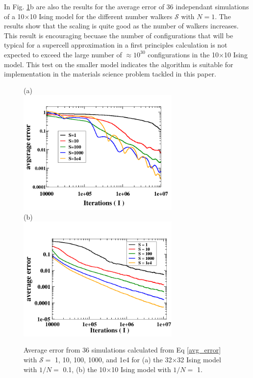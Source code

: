 \documentclass[aps,pre,reprint,superscriptaddress,showkeys]{revtex4-1}
\begin{document}
In Fig. \ref{thirtytwo_Stest}b are also the results for the average error of 36 independant simulations of a 10$\times$10 Ising model for the different number walkers $\mathcal{S}$ with $N=1$. The results show that the scaling is quite good as the number of walkers increases. This result is encouraging becuase the number of configurations that will be typical for a supercell approximation in a first principles calculation is not expected to exceed the large number of $\approx 10^{30}$ configurations in the 10$\times$10 Ising model.  This test on the smaller model indicates the algorithm  is suitable for implementation in the materials science problem tackled in this paper. 
\begin{figure}[h!]
(a)\\
\includegraphics[width=8cm]{./figures/thirtytwo_root0_1_varyS.png}\\
(b)\\
\includegraphics[width=8cm]{./figures/10X10_root1_varyS.png}
\caption{ Average error from 36 simulations calculated from Eq \ref{avg_error} with $\mathcal{S}=$ 1, 10, 100, 1000, and 1e4 for  (a) the 32$\times$32 Ising model with $1/N=$ 0.1, (b) the 10$\times$10 Ising model with $1/N =$ 1. \label{thirtytwo_Stest} }
\end{figure}
\end{document}
